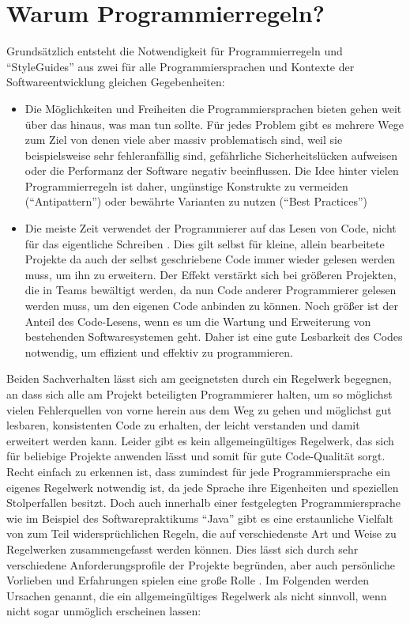 \documentclass[da,ngerman]{stthesis}
\begin{document}
		\section{Warum Programmierregeln?}
			Grundsätzlich entsteht die Notwendigkeit für Programmierregeln und "`StyleGuides"' aus zwei für alle Programmiersprachen und Kontexte der Softwareentwicklung gleichen Gegebenheiten: 
			\begin{itemize}
				\item Die Möglichkeiten und Freiheiten die Programmiersprachen bieten gehen weit über das hinaus, was man tun sollte. Für jedes Problem gibt es mehrere Wege zum Ziel von denen viele aber massiv problematisch sind, weil sie beispielsweise sehr fehleranfällig sind, gefährliche Sicherheitslücken aufweisen oder die Performanz der Software negativ beeinflussen. Die Idee hinter vielen Programmierregeln ist daher, ungünstige Konstrukte zu vermeiden ("`Antipattern"') oder bewährte Varianten zu nutzen ("`Best Practices"')
				\item Die meiste Zeit verwendet der Programmierer auf das Lesen von Code, nicht für das eigentliche Schreiben \cite{CleanCode}. Dies gilt selbst für kleine, allein bearbeitete Projekte da auch der selbst geschriebene Code immer wieder gelesen werden muss, um ihn zu erweitern. Der Effekt verstärkt sich bei größeren Projekten, die in Teams bewältigt werden, da nun Code anderer Programmierer gelesen werden muss, um den eigenen Code anbinden zu können. Noch größer ist der Anteil des Code-Lesens, wenn es um die Wartung und Erweiterung von bestehenden Softwaresystemen geht. Daher ist eine gute Lesbarkeit des Codes notwendig, um effizient und effektiv zu programmieren. 
			\end{itemize}
			Beiden Sachverhalten lässt sich am geeignetsten durch ein Regelwerk begegnen, an dass sich alle am Projekt beteiligten Programmierer halten, um so möglichst vielen Fehlerquellen von vorne herein aus dem Weg zu gehen und möglichst gut lesbaren, konsistenten Code zu erhalten, der leicht verstanden und damit erweitert werden kann. Leider gibt es kein allgemeingültiges Regelwerk, das sich für beliebige Projekte anwenden lässt und somit für gute Code-Qualität sorgt. Recht einfach zu erkennen ist, dass zumindest für jede Programmiersprache ein eigenes Regelwerk notwendig ist, da jede Sprache ihre Eigenheiten und speziellen Stolperfallen besitzt. Doch auch innerhalb einer festgelegten Programmiersprache wie im Beispiel des Softwarepraktikums "`Java"' gibt es eine erstaunliche Vielfalt von zum Teil widersprüchlichen Regeln, die auf verschiedenste Art und Weise zu Regelwerken zusammengefasst werden können. Dies lässt sich durch sehr verschiedene Anforderungsprofile der Projekte begründen, aber auch persönliche Vorlieben und Erfahrungen spielen eine große Rolle \cite{JavaQualityAssurance}. Im Folgenden werden Ursachen genannt, die ein allgemeingültiges Regelwerk als nicht sinnvoll, wenn nicht sogar unmöglich erscheinen lassen:
\end{document}
